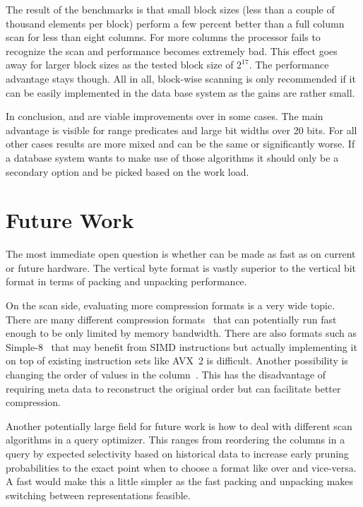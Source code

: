 The result of the benchmarks is that small block sizes (less than a couple of
thousand elements per block) perform a few percent better than a full column
scan for less than eight columns. For more columns the processor fails to
recognize the scan and performance becomes extremely bad. This effect goes away
for larger block sizes as the tested block size of $2^{17}$. The performance
advantage stays though. All in all, block-wise scanning is only recommended if
it can be easily implemented in the data base system as the gains are rather
small.

In conclusion, \bwv{} and \bs{} are viable improvements over \simdscan{} in
some cases. The main advantage is visible for range predicates and large bit
widths over 20 bits. For all other cases results are more mixed and can be the
same or significantly worse. If a database system wants to make use of those
algorithms it should only be a secondary option and be picked based on the work
load.

\section{Future Work}

The most immediate open question is whether \bs{} can be made as fast as \bwv{}
on current or future hardware. The vertical byte format is vastly superior to
the vertical bit format in terms of packing and unpacking performance.

On the scan side, evaluating more compression formats is a very wide topic.
There are many different compression formats~\cite{lemire2015decoding} that can
potentially run fast enough to be only limited by memory bandwidth. There are
also formats such as Simple-8~\cite{Simple8} that may benefit from SIMD
instructions but actually implementing it on top of existing instruction sets
like AVX~2 is difficult. Another possibility is changing the order of values in
the column~\cite{markl1999variable}. This has the disadvantage of requiring meta
data to reconstruct the original order but can facilitate better compression.

Another potentially large field for future work is how to deal with different
scan algorithms in a query optimizer. This ranges from reordering the columns in
a query by expected selectivity based on historical data to increase early
pruning probabilities to the exact point when to choose a format like \bwv{}
over \simdscan{} and vice-versa. A fast \bs{} would make this a little simpler
as the fast packing and unpacking makes switching between representations
feasible.

